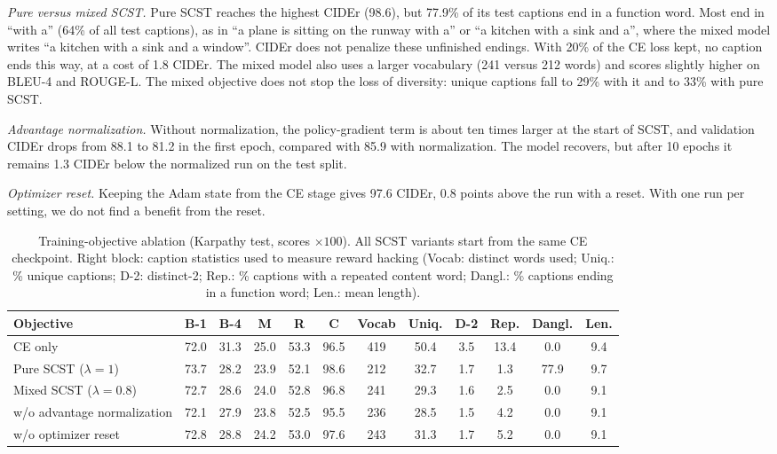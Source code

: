 \documentclass[conference]{IEEEtran}
\begin{document}
\textit{Pure versus mixed SCST.} Pure SCST reaches the highest CIDEr (98.6),
but 77.9\% of its test captions end in a function word. Most end in ``with a''
(64\% of all test captions), as in ``a plane is sitting on the runway with a''
or ``a kitchen with a sink and a'', where the mixed model writes ``a kitchen
with a sink and a window''. CIDEr does not penalize these unfinished endings.
With 20\% of the CE loss kept, no caption ends this way, at a
cost of 1.8 CIDEr. The mixed model also uses a larger vocabulary (241 versus
212 words) and scores slightly higher on BLEU-4
and ROUGE-L. The mixed objective does not stop the loss of diversity: unique
captions fall to 29\% with it and to 33\% with pure SCST.

\textit{Advantage normalization.} Without normalization, the policy-gradient
term is about ten times larger at the start of SCST, and validation CIDEr drops
from 88.1 to 81.2 in the first epoch, compared with 85.9 with normalization.
The model recovers, but after 10 epochs it remains 1.3 CIDEr below the
normalized run on the test split.

\textit{Optimizer reset.} Keeping the Adam state from the CE stage gives 97.6
CIDEr, 0.8 points above the run with a reset. With one run per setting, we do
not find a benefit from the reset.

\begin{table}[t]
\caption{Training-objective ablation (Karpathy test, scores $\times100$). All SCST
variants start from the same CE checkpoint. Right block: caption statistics used
to measure reward hacking (Vocab: distinct words used; Uniq.: \% unique captions;
D-2: distinct-2; Rep.: \% captions with a repeated content word; Dangl.: \%
captions ending in a function word; Len.: mean length).}
\label{tab:loss}
\centering
\setlength{\tabcolsep}{4.5pt}
\begin{tabular}{@{}lccccc|cccccc@{}}
\toprule
Objective & B-1 & B-4 & M & R & C & Vocab & Uniq. & D-2 & Rep. & Dangl. & Len. \\
\midrule
CE only & 72.0 & 31.3 & 25.0 & 53.3 & 96.5 & 419 & 50.4 & 3.5 & 13.4 & 0.0 & 9.4 \\
Pure SCST ($\lambda=1$) & 73.7 & 28.2 & 23.9 & 52.1 & 98.6 & 212 & 32.7 & 1.7 & 1.3 & 77.9 & 9.7 \\
Mixed SCST ($\lambda=0.8$) & 72.7 & 28.6 & 24.0 & 52.8 & 96.8 & 241 & 29.3 & 1.6 & 2.5 & 0.0 & 9.1 \\
\quad w/o advantage normalization & 72.1 & 27.9 & 23.8 & 52.5 & 95.5 & 236 & 28.5 & 1.5 & 4.2 & 0.0 & 9.1 \\
\quad w/o optimizer reset & 72.8 & 28.8 & 24.2 & 53.0 & 97.6 & 243 & 31.3 & 1.7 & 5.2 & 0.0 & 9.1 \\
\bottomrule
\end{tabular}
\end{table}
\end{document}
